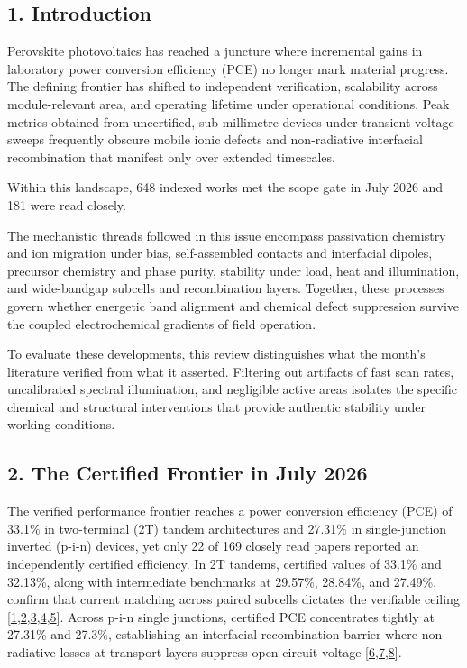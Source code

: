 \documentclass[
  11pt,
]{article}
\begin{document}
\subsection{1. Introduction}\label{introduction}

Perovskite photovoltaics has reached a juncture where incremental gains
in laboratory power conversion efficiency (PCE) no longer mark material
progress. The defining frontier has shifted to independent verification,
scalability across module-relevant area, and operating lifetime under
operational conditions. Peak metrics obtained from uncertified,
sub-millimetre devices under transient voltage sweeps frequently obscure
mobile ionic defects and non-radiative interfacial recombination that
manifest only over extended timescales.

Within this landscape, 648 indexed works met the scope gate in July 2026
and 181 were read closely.

The mechanistic threads followed in this issue encompass passivation
chemistry and ion migration under bias, self-assembled contacts and
interfacial dipoles, precursor chemistry and phase purity, stability
under load, heat and illumination, and wide-bandgap subcells and
recombination layers. Together, these processes govern whether energetic
band alignment and chemical defect suppression survive the coupled
electrochemical gradients of field operation.

To evaluate these developments, this review distinguishes what the
month's literature verified from what it asserted. Filtering out
artifacts of fast scan rates, uncalibrated spectral illumination, and
negligible active areas isolates the specific chemical and structural
interventions that provide authentic stability under working conditions.

\subsection{2. The Certified Frontier in July
2026}\label{the-certified-frontier-in-july-2026}

The verified performance frontier reaches a power conversion efficiency
(PCE) of 33.1\% in two-terminal (2T) tandem architectures and 27.31\% in
single-junction inverted (p-i-n) devices, yet only 22 of 169 closely
read papers reported an independently certified efficiency. In 2T
tandems, certified values of 33.1\% and 32.13\%, along with intermediate
benchmarks at 29.57\%, 28.84\%, and 27.49\%, confirm that current
matching across paired subcells dictates the verifiable ceiling
{[}\href{https://doi.org/10.1126/sciadv.aei2945}{1},\href{https://doi.org/10.1002/anie.1676645}{2},\href{https://doi.org/10.1002/adma.74078}{3},\href{https://doi.org/10.1126/sciadv.aeb8790}{4},\href{https://doi.org/10.1126/sciadv.aef6600}{5}{]}.
Across p-i-n single junctions, certified PCE concentrates tightly at
27.31\% and 27.3\%, establishing an interfacial recombination barrier
where non-radiative losses at transport layers suppress open-circuit
voltage
{[}\href{https://doi.org/10.1002/adma.73807}{6},\href{https://doi.org/10.1126/sciadv.aeg1456}{7},\href{https://doi.org/10.1126/science.aed8175}{8}{]}.
\end{document}
